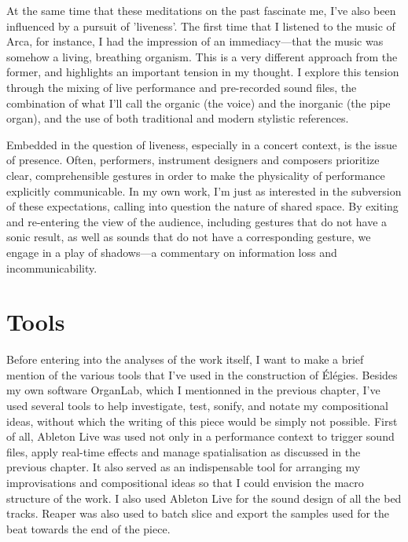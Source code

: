 \documentclass[12pt,twoside,maitrise]{dms_ks}
\theoremstyle{definition}
\begin{document}
{At the same time that these meditations on the past fascinate me, I've also been influenced by a pursuit of 'liveness'. 
The first time that I listened to the music of Arca, for instance, I had the impression of an immediacy---that the music was somehow a living, breathing organism. 
This is a very different approach from the former, and highlights an important tension in my thought. 
I explore this tension through the mixing of live performance and pre-recorded sound files, the combination of what I'll call the organic (the voice) and the inorganic (the pipe organ), and the use of both traditional and modern stylistic references.

Embedded in the question of liveness, especially in a concert context, is the issue of presence. 
Often, performers, instrument designers and composers prioritize clear, comprehensible gestures in order to make the physicality of performance explicitly communicable. 
In my own work, I'm just as interested in the subversion of these expectations, calling into question the nature of shared space. 
By exiting and re-entering the view of the audience, including gestures that do not have a sonic result, as well as sounds that do not have a corresponding gesture, we engage in a play of shadows---a commentary on information loss and incommunicability. 

\section{Tools}

Before entering into the analyses of the work itself, I want to make a brief mention of the various tools that I've used in the construction of Élégies. 
Besides my own software OrganLab, which I mentionned in the previous chapter, I've used several tools to help investigate, test, sonify, and notate my compositional ideas, without which the writing of this piece would be simply not possible. 
First of all, Ableton Live was used not only in a performance context to trigger sound files, apply real-time effects and manage spatialisation as discussed in the previous chapter. 
It also served as an indispensable tool for arranging my improvisations and compositional ideas so that I could envision the macro structure of the work. 
I also used Ableton Live for the sound design of all the bed tracks. 
Reaper was also used to batch slice and export the samples used for the beat towards the end of the piece.

}
\end{document}
